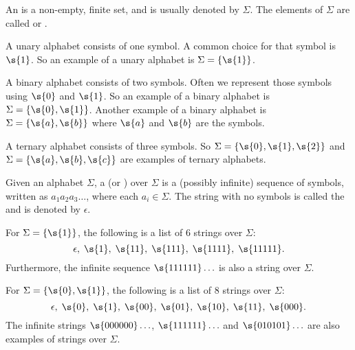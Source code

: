 \begin{flex}
\begin{definition} \label{definition:Alphabet-symbol-character}
An  is a non-empty, finite set, and is usually denoted by $\Sigma$. 
The elements of $\Sigma$ are called  or .
\end{definition}

\begin{example} \label{example:Unary-alphabet}
A unary alphabet consists of one symbol. A common choice for that symbol is $\s{1}$. 
So an example of a unary alphabet is $\Sigma = \{\s{1}\}$.
\end{example}

\begin{example} \label{example:Binary-alphabet}
A binary alphabet consists of two symbols. 
Often we represent those symbols using $\s{0}$ and $\s{1}$. 
So an example of a binary alphabet is $\Sigma = \{\s{0},\s{1}\}$.
Another example of a binary alphabet is $\Sigma=\{\s{a},\s{b}\}$ where $\s{a}$ and $\s{b}$ are the symbols.
\end{example}

\begin{example} \label{example:Ternary-alphabet}
A ternary alphabet consists of three symbols. 
So $\Sigma=\{\s{0},\s{1},\s{2}\}$ and $\Sigma=\{\s{a},\s{b},\s{c}\}$ are examples of ternary alphabets. 
\end{example}
\end{flex}


\begin{flex}
\begin{definition} \label{definition:String-word-empty-string}
Given an alphabet $\Sigma$, a  (or ) over $\Sigma$ is a (possibly infinite) sequence of symbols, written as $a_1a_2a_3\ldots$, where each $a_i \in \Sigma$. 
The string with no symbols is called the  and is denoted by $\epsilon$.
\end{definition}

\begin{example} \label{example:Strings-over-the-unary-alphabet}
For $\Sigma = \{\s{1}\}$, the following is a list of 6 strings over $\Sigma$: 
\[
    \epsilon,\; \s{1},\; \s{11},\; \s{111},\; \s{1111},\; \s{11111}.
\]
Furthermore, the infinite sequence $\s{111111}\ldots$ is also a string over $\Sigma$.
\end{example}

\begin{example} \label{example:Strings-over-the-binary-alphabet}
For $\Sigma = \{\s{0},\s{1}\}$, the following is a list of 8 strings over $\Sigma$: 
\[
\epsilon,\; \s{0},\; \s{1},\; \s{00},\; \s{01},\; \s{10},\; \s{11},\; \s{000}.
\] 
The infinite strings $\s{000000}\ldots$, $\s{111111}\ldots$ and $\s{010101}\ldots$ are also examples of strings over $\Sigma$.
\end{example}
\end{flex}


